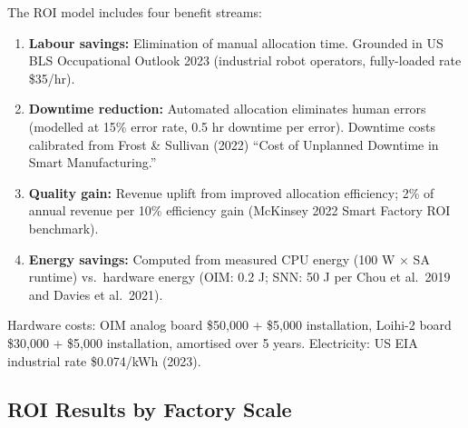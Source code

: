 The ROI model includes four benefit streams:
\begin{enumerate}
  \item \textbf{Labour savings:} Elimination of manual allocation time.
        Grounded in US BLS Occupational Outlook 2023 (industrial robot
        operators, fully-loaded rate \$35/hr).
  \item \textbf{Downtime reduction:} Automated allocation eliminates human
        errors (modelled at 15\% error rate, 0.5 hr downtime per error).
        Downtime costs calibrated from Frost \& Sullivan (2022)
        ``Cost of Unplanned Downtime in Smart Manufacturing.''
  \item \textbf{Quality gain:} Revenue uplift from improved allocation
        efficiency; 2\% of annual revenue per 10\% efficiency gain
        (McKinsey 2022 Smart Factory ROI benchmark).
  \item \textbf{Energy savings:} Computed from measured CPU energy
        (100 W $\times$ SA runtime) vs.\ hardware energy (OIM: 0.2 \textmu J;
        SNN: 50 \textmu J per Chou et al.\ 2019 and Davies et al.\ 2021).
\end{enumerate}

Hardware costs: OIM analog board \$50,000 + \$5,000 installation,
Loihi-2 board \$30,000 + \$5,000 installation, amortised over 5 years.
Electricity: US EIA industrial rate \$0.074/kWh (2023).

\subsection{ROI Results by Factory Scale}

